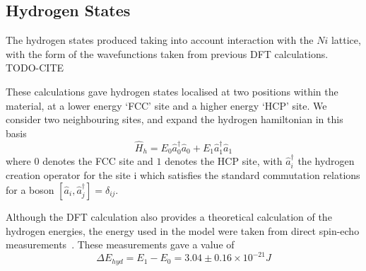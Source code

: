 \subsection{Hydrogen States}
The hydrogen states produced
taking into account interaction with
the \(Ni\) lattice, with the form
of the wavefunctions taken
from previous DFT calculations. TODO-CITE

These calculations gave hydrogen
states localised at two positions
within the material, at a lower energy
`FCC' site and a higher energy
`HCP' site. We consider two neighbouring
sites, and expand the hydrogen
hamiltonian in this basis
\begin{equation}
  \hat{H}_{h} =
  E_0 \hat{a}^\dagger_0 \hat{a}_0
  + E_1 \hat{a}^\dagger_1 \hat{a}_1
\end{equation}
where \(0\) denotes the FCC site and \(1\)
denotes the HCP site,
with \(\hat{a}^\dagger_i\) the hydrogen creation
operator for the site i
which satisfies the standard commutation
relations for a boson
\(\left[ \hat{a}_i, \hat{a}^\dagger_j \right]
= \delta_{ij}\).

Although the DFT calculation
also provides a theoretical calculation
of the hydrogen energies, the
energy used in the
model were
taken from direct spin-echo measurements~\cite{Jianding-Zhu}.
These measurements gave a value of
\begin{equation}
  \Delta{}E_{hyd} = E_1 - E_0
  = 3.04\pm0.16\times{}10^{-21} J
  \label{eqn:hydrogen energy difference}
\end{equation}


